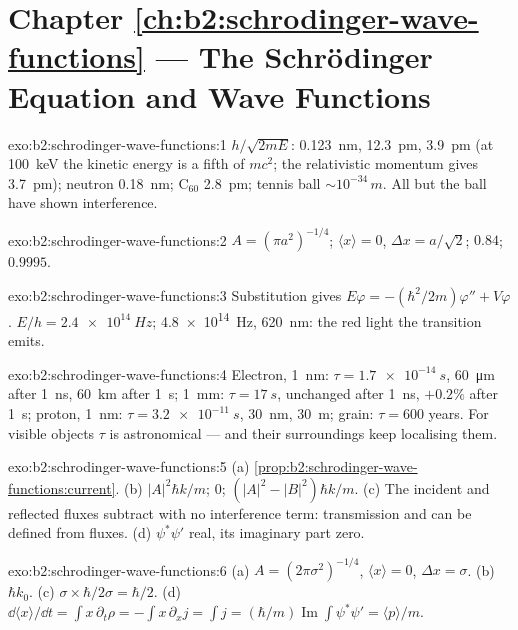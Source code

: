 \section*{Chapter \ref{ch:b2:schrodinger-wave-functions} --- The Schrödinger Equation and Wave Functions}

\begin{solution}{exo:b2:schrodinger-wave-functions:1}
$h/\sqrt{2mE}$: \qty{0.123}{nm}, \qty{12.3}{pm}, \qty{3.9}{pm} (at \qty{100}{keV} the
kinetic energy is a fifth of $mc^2$; the relativistic momentum gives
\qty{3.7}{pm}); neutron \qty{0.18}{nm}; C$_{60}$ \qty{2.8}{pm}; tennis ball
$\sim 10^{-34}\,\unit{m}$. All but the ball have shown interference.
\end{solution}

\begin{solution}{exo:b2:schrodinger-wave-functions:2}
$A = (\pi a^2)^{-1/4}$; $\langle x\rangle = 0$, $\Delta x = a/\sqrt2$; $0.84$; $0.9995$.
\end{solution}

\begin{solution}{exo:b2:schrodinger-wave-functions:3}
Substitution gives $E\varphi = -(\hbar^2/2m)\varphi'' + V\varphi$. $E/h =
\qty{2.4e14}{Hz}$; \qty{4.8e14}{Hz}, \qty{620}{nm}: the red light the transition
emits.
\end{solution}

\begin{solution}{exo:b2:schrodinger-wave-functions:4}
Electron, \qty{1}{nm}: $\tau = \qty{1.7e-14}{s}$, \qty{60}{\micro m} after \qty{1}{ns},
\qty{60}{km} after \qty{1}{s}; \qty{1}{mm}: $\tau = \qty{17}{s}$, unchanged after \qty{1}{ns},
$+0.2\%$ after \qty{1}{s}; proton, \qty{1}{nm}: $\tau = \qty{3.2e-11}{s}$, \qty{30}{nm},
\qty{30}{m}; grain: $\tau = 600$ years. For visible objects $\tau$ is
astronomical --- and their surroundings keep localising them.
\end{solution}

\begin{solution}{exo:b2:schrodinger-wave-functions:5}
(a) \cref{prop:b2:schrodinger-wave-functions:current}. (b) $|A|^2\hbar k/m$;
$0$; $(|A|^2 - |B|^2)\hbar k/m$. (c) The incident and reflected fluxes
subtract with no interference term: transmission and  can be defined from fluxes. (d) $\psi^*\psi'$ real, its
imaginary part zero.
\end{solution}

\begin{solution}{exo:b2:schrodinger-wave-functions:6}
(a) $A = (2\pi\sigma^2)^{-1/4}$, $\langle x\rangle = 0$, $\Delta x = \sigma$. (b) $\hbar k_0$.
(c) $\sigma \times \hbar/2\sigma = \hbar/2$. (d) $\dd\langle x\rangle/\dd t = \int x\,
\partial_t\rho = -\int x\,\partial_xj = \int j = (\hbar/m)\operatorname{Im}\int\psi^*
\psi' = \langle p\rangle/m$.
\end{solution}

